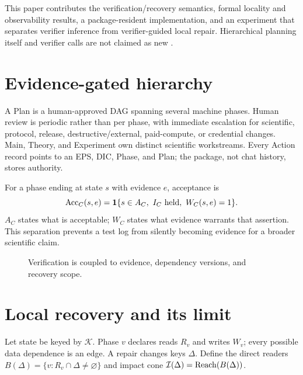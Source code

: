 \documentclass{article}
\begin{document}
This paper contributes the verification/recovery semantics, formal locality and observability results, a package-resident implementation, and an experiment that separates verifier inference from verifier-guided local repair. Hierarchical planning itself and verifier calls are not claimed as new \citep{yao2023react,shinn2023reflexion,lightman2023verify}.

\section{Evidence-gated hierarchy}
A Plan is a human-approved DAG spanning several machine phases. Human review is periodic rather than per phase, with immediate escalation for scientific, protocol, release, destructive/external, paid-compute, or credential changes. Main, Theory, and Experiment own distinct scientific workstreams. Every Action record points to an EPS, DIC, Phase, and Plan; the package, not chat history, stores authority.

For a phase ending at state $s$ with evidence $e$, acceptance is
\[
\operatorname{Acc}_C(s,e)=\mathbf 1\{s\in A_C,\ I_C\text{ held},\ W_C(s,e)=1\}.
\]
$A_C$ states what is acceptable; $W_C$ states what evidence warrants that assertion. This separation prevents a test log from silently becoming evidence for a broader scientific claim.

\begin{figure}[t]
\centering
{}
\caption{Verification is coupled to evidence, dependency versions, and recovery scope.}
\label{fig:loop}
\end{figure}

\section{Local recovery and its limit}
Let state be keyed by $\mathcal K$. Phase $v$ declares reads $R_v$ and writes $W_v$; every possible data dependence is an edge. A repair changes keys $\Delta$. Define the direct readers $B(\Delta)=\{v:R_v\cap\Delta\ne\varnothing\}$ and impact cone $\mathcal I(\Delta)=\operatorname{Reach}(B(\Delta))$.
\end{document}
